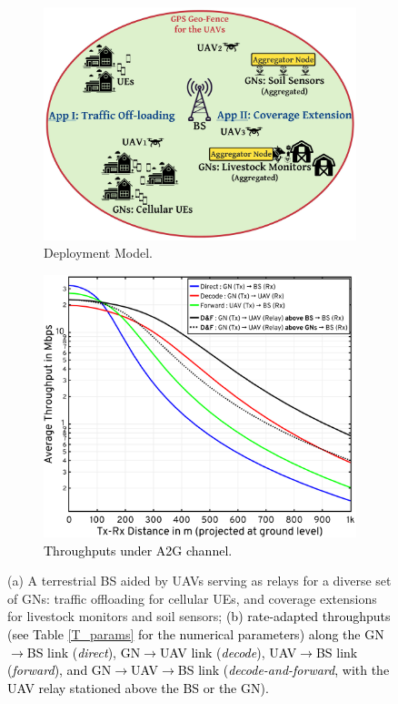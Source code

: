 \documentclass[12pt, draftcls, onecolumn]{IEEEtran}
\theoremstyle{plain}
\theoremstyle{definition}
\theoremstyle{remark}
\newcommand\hlt[1]{\textcolor{black}{#1}}
\begin{document}
\begin{figure} [t]
    \begin{subfigure}{0.505\linewidth}
        \centering
        \includegraphics[width=1.0\linewidth]{figs/Deployment_Model.jpeg}
        \caption{Deployment Model.}
        \label{F1}
    \end{subfigure}
    \hfill
    \begin{subfigure}{0.44\linewidth}
        \centering
        \includegraphics[width=1.0\linewidth]{figs/Channel_Model.jpg}
        \caption{\hlt{Throughputs under A2G channel.}}
        \label{F2}
    \end{subfigure}
    \vspace{-2mm}
    \caption{(a) A terrestrial BS aided by UAVs serving as relays for a diverse set of GNs: traffic offloading for cellular UEs, and coverage extensions for livestock monitors and soil sensors; \hlt{(b) rate-adapted throughputs (see Table \ref{T_params} for the numerical parameters) along the GN${\rightarrow}$BS link (\emph{direct}), GN${\rightarrow}$UAV link (\emph{decode}),  UAV${\rightarrow}$BS link (\emph{forward}), and GN${\rightarrow}$UAV${\rightarrow}$BS link (\emph{decode-and-forward}, with the UAV relay stationed above the BS or the GN).}}
    \label{F1andF2}
\end{figure}
\end{document}
